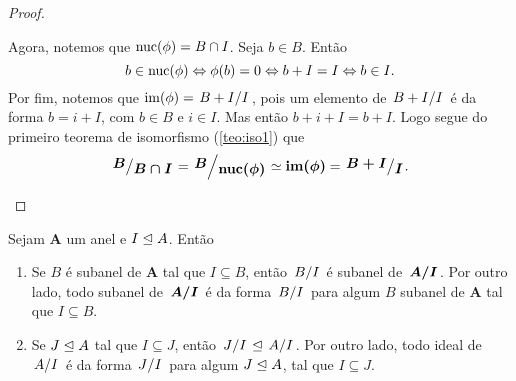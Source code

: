 \begin{proof}
\begin{enumerate}
	Agora, notemos que $\operatorname{nuc}(\phi)=B \cap I$. Seja $b \in B$. Então
	\begin{equation*}
	b \in \operatorname{nuc}(\phi) \Leftrightarrow \phi(b)=0 \Leftrightarrow b+I = I \Leftrightarrow b \in I.
	\end{equation*}
	Por fim, notemos que $\im(\phi)=\quo{B+I}{I}$, pois um elemento de $\quo{B+I}{I}$ é da forma $b=i+I$, com $b \in B$ e $i \in I$. Mas então $b+i+I=b+I$. Logo segue do primeiro teorema de isomorfismo (\ref{teo:iso1}) que
	\begin{equation*}
	\bm{\quo{B}{B \cap I}} = \bm{\quo{B}{\nuc(\phi)}} \simeq \bm{\im(\phi)} =\bm{\quo{B+I}{I}}.
	\end{equation*}
	\end{enumerate}
\end{proof}

\begin{lemma}
	Sejam $\bm A$ um anel e $I \mathrel{\unlhd} A$. Então
	\begin{enumerate}
	\item Se $B$ é subanel de $\bm A$ tal que $I \subseteq B$, então $\quo{B}{I}$ é subanel de $\bm{\quo{A}{I}}$. Por outro lado, todo subanel de $\bm{\quo{A}{I}}$ é da forma $\quo{B}{I}$ para algum $B$ subanel de $\bm A$ tal que $I \subseteq B$.
	\item Se $J \mathrel{\unlhd} A$ tal que $I \subseteq J$, então $\quo{J}{I} \ide \quo{A}{I}$. Por outro lado, todo ideal de $\quo{A}{I}$ é da forma $\quo{J}{I}$ para algum $J \mathrel{\unlhd} A$, tal que $I \subseteq J$.
	\end{enumerate}
\end{lemma}
